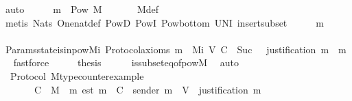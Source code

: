 \begin{isabellebody}
\ auto\isanewline
\ \ \isamarkupfalse%
\ \isamarkupfalse%
\ {\isachardoublequoteopen}{\isacharbraceleft}m{\isacharprime}{\isacharbraceright}\ {\isasymin}\ Pow\ M{\isachardoublequoteclose}\ \isanewline
\ \ \ \ \isamarkupfalse%
\ M{\isacharunderscore}def\isanewline
\ \ \ \ \isamarkupfalse%
\ {\isacharparenleft}metis\ Nats{\isacharunderscore}{}\ One{\isacharunderscore}nat{\isacharunderscore}def\ PowD\ PowI\ Pow{\isacharunderscore}bottom\ UN{\isacharunderscore}I\ insert{\isacharunderscore}subset{\isacharparenright}\isanewline
\ \ \isamarkupfalse%
\ \isamarkupfalse%
\ {\isachardoublequoteopen}{\isacharbraceleft}m{\isacharprime}{\isacharbraceright}\ {\isasymnotin}\ {\isasymSigma}{\isachardoublequoteclose}\isanewline
\ \ \ \ \isamarkupfalse%
\ Params{\isachardot}state{\isacharunderscore}is{\isacharunderscore}in{\isacharunderscore}pow{\isacharunderscore}M{\isacharunderscore}i\ Protocol{\isacharunderscore}axioms\ {\isacartoucheopen}m{\isacharprime}\ {\isasymin}\ M{\isacharunderscore}i\ {\isacharparenleft}V{\isacharcomma}\ C{\isacharcomma}\ {\isasymepsilon}{\isacharparenright}\ {\isacharparenleft}Suc\ {}{\isacharparenright}\ {\isasymand}\ justification\ m{\isacharprime}\ {\isacharequal}\ {\isacharbraceleft}m{\isacharbraceright}{\isacartoucheclose}\ \isamarkupfalse%
\ fastforce\isanewline
\ \ \isamarkupfalse%
\ \isamarkupfalse%
\ {\isacharquery}thesis\isanewline
\ \ \ \ \isamarkupfalse%
\ {\isasymSigma}{\isacharunderscore}is{\isacharunderscore}subseteq{\isacharunderscore}of{\isacharunderscore}pow{\isacharunderscore}M\ \isamarkupfalse%
\ auto\isanewline
{}\isamarkupfalse%
%
\endisatagproof
{\isafoldproof}%
%
\isadelimproof
\isanewline
%
\endisadelimproof
\isanewline
\isanewline
{}\isamarkupfalse%
\ {\isacharparenleft}\ Protocol{\isacharparenright}\ M{\isacharunderscore}type{\isacharunderscore}counterexample{\isacharcolon}\ \isanewline
\ \ {\isachardoublequoteopen}{\isacharparenleft}{\isasymforall}\ {\isasymsigma}{\isachardot}\ {\isasymepsilon}\ {\isasymsigma}\ {\isacharequal}\ C{\isacharparenright}\ {\isasymLongrightarrow}\ M\ {\isacharequal}\ {\isacharbraceleft}m{\isachardot}\ est\ m\ {\isasymin}\ C\ {\isasymand}\ sender\ m\ {\isasymin}\ V\ {\isasymand}\ justification\ m\ {\isasymin}\ {\isasymSigma}{\isacharbraceright}{\isachardoublequoteclose}\isanewline
%
\isadelimproof
\ \ %
\endisadelimproof

\end{isabellebody}
